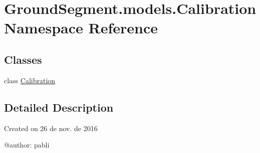 \hypertarget{namespace_ground_segment_1_1models_1_1_calibration}{}\section{Ground\+Segment.\+models.\+Calibration Namespace Reference}
\label{namespace_ground_segment_1_1models_1_1_calibration}
\subsection*{Classes}
\begin{DoxyCompactItemize}
\item 
class \hyperlink{class_ground_segment_1_1models_1_1_calibration_1_1_calibration}{Calibration}
\end{DoxyCompactItemize}


\subsection{Detailed Description}
\begin{DoxyVerb}Created on 26 de nov. de 2016

@author: pabli
\end{DoxyVerb}
 